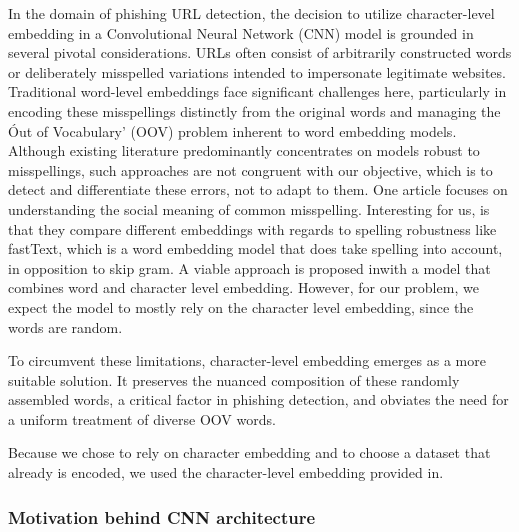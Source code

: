 \documentclass{article}
\begin{document}
    In the domain of phishing URL detection, the decision to utilize character-level embedding in a Convolutional Neural Network (CNN) model is grounded in several pivotal considerations.
    URLs often consist of arbitrarily constructed words or deliberately misspelled variations intended to impersonate legitimate websites.
    Traditional word-level embeddings face significant challenges here, particularly in encoding these misspellings distinctly from the original words and managing the \'Out of Vocabulary' (OOV) problem inherent to word embedding models.
    Although existing literature predominantly concentrates on models robust to misspellings, such approaches are not congruent with our objective, which is to detect and differentiate these errors, not to adapt to them.
    One article focuses on understanding the social meaning of common misspelling\cite{OOVmispelling}.
    Interesting for us, is that they compare different embeddings with regards to spelling robustness like fastText, which is a word embedding model that does take spelling into account, in opposition to skip gram.
    A viable approach is proposed in\cite{WordCharacterEmbeddings}with a model that combines word and character level embedding.
    However, for our problem, we expect the model to mostly rely on the character level embedding, since the words are random.

    To circumvent these limitations, character-level embedding emerges as a more suitable solution.
    It preserves the nuanced composition of these randomly assembled words, a critical factor in phishing detection, and obviates the need for a uniform treatment of diverse OOV words.

    Because we chose to rely on character embedding and to choose a dataset that already is encoded, we used the character-level embedding provided in\cite{CharacterLevelCNN}.

    \subsubsection{Motivation behind CNN architecture}
\end{document}
